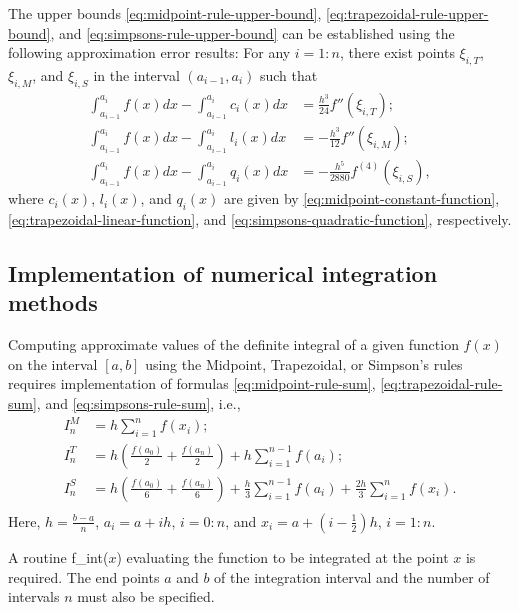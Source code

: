 The upper bounds \eqref{eq:midpoint-rule-upper-bound},
    \eqref{eq:trapezoidal-rule-upper-bound}, and
    \eqref{eq:simpsons-rule-upper-bound} can be established using the following
    approximation error results: For any $ i = 1 : n $, there exist points
    $ \xi_{i,T} $, $ \xi_{i,M} $, and $ \xi_{i,S} $ in the interval
    $ (a_{i-1}, a_i) $ such that
\begin{align}
    \int_{a_{i-1}}^{a_i} f(x) dx - \int_{a_{i-1}}^{a_i} c_i(x) dx &=
        \frac{h^3}{24} f''(\xi_{i,T}); \\
    \int_{a_{i-1}}^{a_i} f(x) dx - \int_{a_{i-1}}^{a_i} l_i(x) dx &=
        -\frac{h^3}{12} f''(\xi_{i,M}); \\
    \int_{a_{i-1}}^{a_i} f(x) dx - \int_{a_{i-1}}^{a_i} q_i(x) dx &=
        -\frac{h^5}{2880} f^{(4)}(\xi_{i,S}),
\end{align}
where $ c_i(x) $, $ l_i(x) $, and $ q_i(x) $ are given by
    \eqref{eq:midpoint-constant-function},
    \eqref{eq:trapezoidal-linear-function}, and
    \eqref{eq:simpsons-quadratic-function}, respectively.

\subsection{Implementation of numerical integration methods}
Computing approximate values of the definite integral of a given function
    $ f(x) $ on the interval $ [a, b] $ using the Midpoint, Trapezoidal, or
    Simpson's rules requires implementation of formulas
    \eqref{eq:midpoint-rule-sum}, \eqref{eq:trapezoidal-rule-sum}, and
    \eqref{eq:simpsons-rule-sum}, i.e.,
\begin{align}
    I_n^M &= h \sum_{i=1}^{n} f(x_i); \\
    I_n^T &= h \left( \frac{f(a_0)}{2} + \frac{f(a_n)}{2} \right) +
        h \sum_{i=1}^{n-1} f(a_i); \\
    I_n^S &= h \left( \frac{f(a_0)}{6} + \frac{f(a_n)}{6} \right) +
        \frac{h}{3} \sum_{i=1}^{n-1} f(a_i) +
        \frac{2h}{3} \sum_{i=1}^{n} f(x_i). \\
\end{align}
Here, $ h = \frac{b-a}{n} $, $ a_i = a + i h $, $ i = 0:n $, and
    $ x_i = a + \left( i - \frac{1}{2} \right) h $, $ i = 1:n $.

A routine f\_int($ x $) evaluating the function to be integrated at the point
    $ x $ is required.
The end points $ a $ and $ b $ of the integration interval and the number of
    intervals $ n $ must also be specified.

